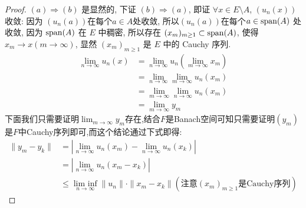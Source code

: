 \begin{proof}
    $(a)\Rightarrow(b)$ 是显然的, 下证 $(b)\Rightarrow(a)$,
    即证 $\forall x\in E\setminus A$, $(u_n(x))$ 收敛:
    因为 $(u_n(a))$在每个$a\in A$处收敛, 所以$(u_n(a))$在每个$a\in\operatorname{span}(A)$ 处收敛,
    因为 $\operatorname{span}(A)$ 在 $E$ 中稠密, 所以存在 $(x_m)_{m\geq1}\subset\operatorname{span}(A)$,
    使得 $x_m\to x(m\to\infty)$, 显然 $(x_m)_{m\geq1}$ 是 $E$ 中的 Cauchy 序列. 
    \[\begin{split}
    \lim_{n\to\infty}u_n(x)
    &=\lim_{n\to\infty}u_n\left(\lim_{m\to\infty}x_m\right)\\
    &=\lim_{n\to\infty}\lim_{m\to\infty}u_n(x_m)\\
    &=\lim_{m\to\infty}\lim_{n\to\infty}u_n(x_m)\\
    &=\lim_{m\to\infty}y_m\end{split}\]
    下面我们只需要证明$\lim_{m\to\infty}y_m$存在,结合$F$是Banach空间可知只需要证明$(y_m)$是$F$中Cauchy序列即可,而这个结论通过下式即得:
    \[\begin{split}
    \|y_m-y_k\|
    &=|\lim_{n\to\infty}u_n(x_m)-\lim_{n\to\infty}u_n(x_k)|\\
    &=|\lim_{n\to\infty}u_n(x_m-x_k)|\\
    &\leq\mathop{\textrm{lim inf}}\limits_{n\to\infty}\|u_n\|\cdot\|x_m-x_k\|\left(\mbox{注意}(x_m)_{m\geq1}\mbox{是}\mathrm{Cauchy}\mbox{序列}\right)
    \end{split}\]
\end{proof}



